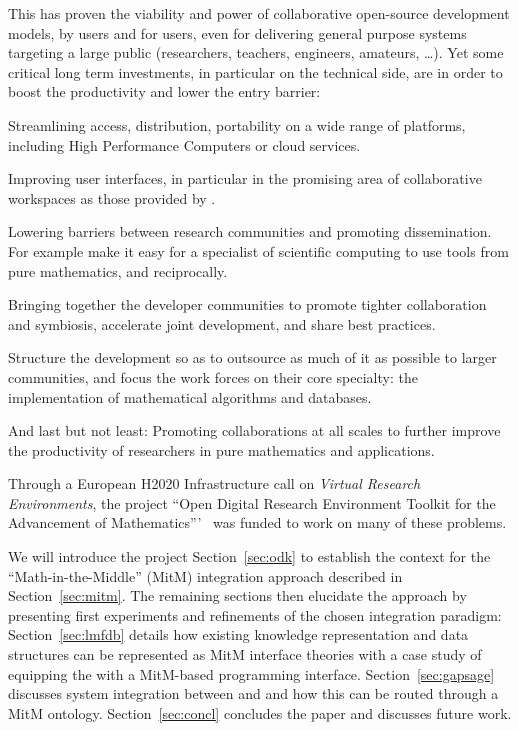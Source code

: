 This has proven the viability and power of collaborative open-source development models,
by users and for users, even for delivering general purpose systems targeting a large
public (researchers, teachers, engineers, amateurs, \ldots). Yet some critical long term
investments, in particular on the technical side, are in order to boost the productivity
and lower the entry barrier:
\begin{compactitem}
\item Streamlining access, distribution, portability on a wide range of platforms, including
  High Performance Computers or cloud services.
\item Improving user interfaces, in particular in the promising area of collaborative
  workspaces as those provided by \SMC.
\item Lowering barriers between research communities and promoting dissemination. For example
  make it easy for a specialist of scientific computing to use tools from pure
  mathematics, and reciprocally.
\item Bringing together the developer communities to promote tighter collaboration and
  symbiosis, accelerate joint development, and share best practices.
\item Structure the development so as to outsource as much of it as possible to larger communities, and focus
  the work forces on their core specialty: the implementation of mathematical algorithms
  and databases.
\item And last but not least: Promoting collaborations at all scales to further improve
  the productivity of researchers in pure mathematics and applications.
\end{compactitem}

Through a European H2020 Infrastructure call \cite{EINFRA-9} on \emph{Virtual Research Environments}, the project ``Open Digital Research Environment Toolkit for the Advancement of Mathematics'''~\cite{OpenDreamKit:on} was funded to work on many of these problems. 

We will introduce the \ODK project Section~\ref{sec:odk} to establish the context for the
``Math-in-the-Middle'' (MitM) integration approach described in
Section~\ref{sec:mitm}. The remaining sections then elucidate the approach by presenting
first experiments and refinements of the chosen integration paradigm:
Section~\ref{sec:lmfdb} details how existing knowledge representation and data structures
can be represented as MitM interface theories with a case study of equipping the \LMFDB
with a MitM-based programming interface.  Section~\ref{sec:gapsage} discusses system
integration between \GAP and \Sage and how this can be routed through a MitM
ontology. Section~\ref{sec:concl} concludes the paper and discusses future work.


